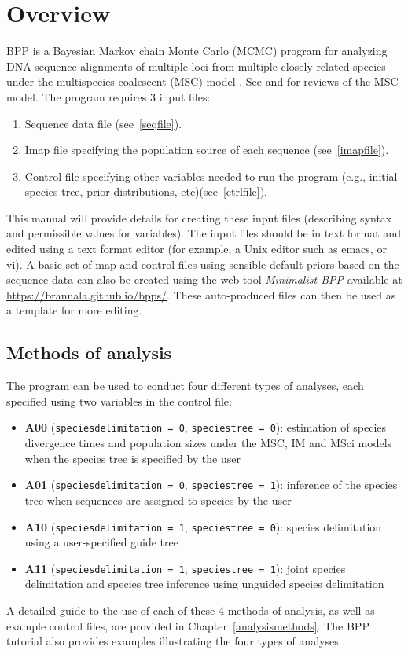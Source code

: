 \documentclass[a4paper]{book}
\numberwithin{equation}{section} \renewcommand{\baselinestretch}{0.55}
\begin{document}
\section{Overview}
\textsc{BPP} is a Bayesian Markov chain Monte Carlo (MCMC) program for
analyzing DNA sequence alignments of multiple loci from multiple
closely-related species under the multispecies coalescent (MSC) model
\citep{Yang2002, Rannala2003}.  See \cite{Xu2016} and
\cite{Rannala2020a} for reviews of the MSC model.  The program
requires 3 input files:
\begin{enumerate}
\item Sequence data file (see~\ref{seqfile}).
\item Imap file specifying the population source of each sequence
  (see~\ref{imapfile}).
\item Control file specifying other variables needed to run the
  program (e.g., initial species tree, prior distributions,
  etc)(see~\ref{ctrlfile}).
\end{enumerate}
This manual will provide details for creating these input files
(describing syntax and permissible values for variables). The input
files should be in text format and edited using a text format editor
(for example, a Unix editor such as emacs, or vi).  A basic set of map
and control files using sensible default priors based on the sequence
data can also be created using the web tool \emph{Minimalist BPP}
available at
\href{https://brannala.github.io/bpps/}{https://brannala.github.io/bpps/}.
These auto-produced files can then be used as a template for more
editing.

\subsection{Methods of analysis}
The program can be used to conduct four different types of analyses,
each specified using two variables in the control file:
\begin{itemize}
\item \textbf{A00} (\texttt{speciesdelimitation = 0},
  \texttt{speciestree = 0}): estimation of species divergence times
  and population sizes under the MSC, IM and MSci models when the species
  tree is specified by the user \citep{Rannala2003, Flouri2020a}
\item \textbf{A01} (\texttt{speciesdelimitation = 0},
  \texttt{speciestree = 1}): inference of the species tree when
  sequences are assigned to species by the user \citep{Rannala2017}
\item \textbf{A10} (\texttt{speciesdelimitation = 1},
  \texttt{speciestree = 0}): species delimitation using a
  user-specified guide tree \citep{Yang2010, Rannala2013}
\item \textbf{A11} (\texttt{speciesdelimitation = 1},
  \texttt{speciestree = 1}): joint species delimitation and species
  tree inference using unguided species delimitation \citep{Yang2014a}
\end{itemize}
A detailed guide to the use of each of these 4 methods of analysis, as
well as example control files, are provided in
Chapter~\ref{analysismethods}.  The \textsc{BPP} tutorial also provides
examples illustrating the four types of analyses \citep{Yang2015,
  Flouri2020b}.
\end{document}
